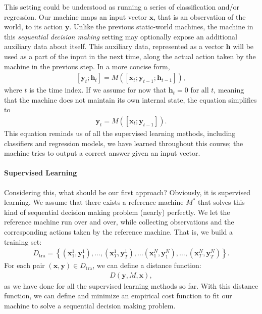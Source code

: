 \documentclass{report}
\newcommand{\vect}[1]{\mathbf{#1}}
\newcommand{\vh}[0]{\vect{h}}
\newcommand{\vx}[0]{\vect{x}}
\newcommand{\vy}[0]{\vect{y}}
\newcommand{\tra}{\text{tra}}
\begin{document}
This setting could be understood as running a series of classification and/or
regression. Our machine maps an input vector $\vx$, that is an observation of
the world, to its action $\vy$. Unlike the previous static-world machines, the
machine in this {\it sequential decision making} setting may optionally expose
an additional auxiliary data about itself. This auxiliary data, represented as a
vector $\vh$ will be used as a part of the input in the next time, along the
actual action taken by the machine in the previous step. In a more concise form, 
\begin{align*}
    \left[ \vy_t; \vh_t\right] = M(\left[ \vx_t ; \vy_{t-1} ;\vh_{t-1} \right]),
\end{align*}
where $t$ is the time index.  If we assume for now that $\vh_t=0$ for all $t$,
meaning that the machine does not maintain its own internal state, the equation
simplifies to 
\begin{align*}
    \vy_t = M(\left[ \vx_t ; \vy_{t-1} \right]).
\end{align*}
This equation reminds us of all the supervised learning methods, including
classifiers and regression models, we have learned throughout this course; the
machine tries to output a correct answer given an input vector. 

\paragraph{Supervised Learning}

Considering this, what should be our first approach? Obviously, it is supervised
learning. We assume that there exists a reference machine $M^*$ that solves this
kind of sequential decision making problem (nearly) perfectly. We let the
reference machine run over and over, while collecting observations and the
corresponding actions taken by the reference machine. That is, we build a
training set:
\begin{align*}
    D_{\tra} = \left\{ 
        (\vx_1^1, \vy_1^1), \ldots, (\vx_T^1, \vy_T^1), \ldots
        (\vx_1^N, \vy_1^N), \ldots, (\vx_T^N, \vy_T^N)
    \right\}.
\end{align*}
For each pair $(\vx, \vy) \in D_{\tra}$, we can define a distance function:
\begin{align*}
    D(\vy, M, \vx),
\end{align*}
as we have done for all the supervised learning methods so far. With this
distance function, we can define and minimize an empirical cost function to fit
our machine to solve a sequential decision making problem.
\end{document}
